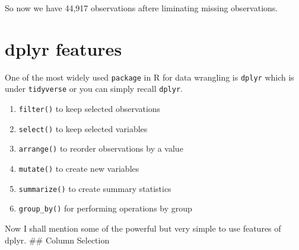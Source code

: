 \documentclass[
  letterpaper,
  DIV=11,
  numbers=noendperiod]{scrartcl}
\newenvironment{Shaded}{\begin{snugshade}}{\end{snugshade}}
\newcommand{\DocumentationTok}[1]{\textcolor[rgb]{0.37,0.37,0.37}{\textit{#1}}}
\providecommand{\tightlist}{%
  \setlength{\itemsep}{0pt}\setlength{\parskip}{0pt}}\usepackage{longtable,booktabs,array}
\begin{document}
\begin{Shaded}
\end{Shaded}

So now we have 44,917 observations aftere liminating missing
observations.

\hypertarget{dplyr-features}{%
\section{dplyr features}\label{dplyr-features}}

One of the most widely used \texttt{package} in R for data wrangling is
\texttt{dplyr} which is under \texttt{tidyverse} or you can simply
recall \texttt{dplyr}.

\begin{enumerate}
\def\labelenumi{\arabic{enumi}.}
\tightlist
\item
  \texttt{filter()} to keep selected observations
\item
  \texttt{select()} to keep selected variables
\item
  \texttt{arrange()} to reorder observations by a value
\item
  \texttt{mutate()} to create new variables
\item
  \texttt{summarize()} to create summary statistics
\item
  \texttt{group\_by()} for performing operations by group
\end{enumerate}

Now I shall mention some of the powerful but very simple to use features
of dplyr. \#\# Column Selection
\end{document}
